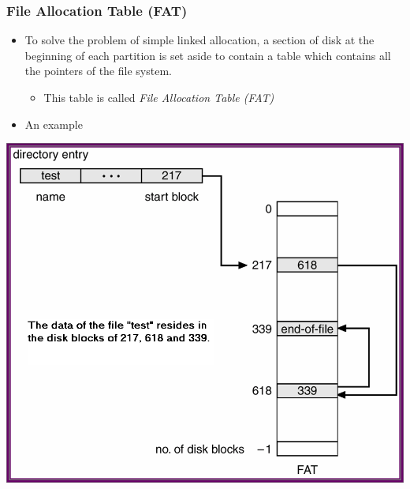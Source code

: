 \documentclass[CJKutf8,xcolor=pdftex,dvipsnames,table]{beamer}
\begin{document}
\begin{CJK*}{UTF8}{song}
  \begin{frame}
    \frametitle{File Allocation Table (FAT)} \pause
    \begin{itemize}\parskip=0pt
    \item To solve the problem of simple linked allocation, a section of disk at the beginning of each partition is set aside to contain a table which contains all the pointers of the file system. \pause
      \begin{itemize}\parskip=0pt
      \item This table is called \emph{File Allocation Table (FAT)} \pause
      \end{itemize}
    \item An example \pause
    \end{itemize}
    \begin{center}
      \includegraphics[scale=0.18]{v6f12-7}
    \end{center}
  \end{frame}
  

\end{CJK*}
\end{document}

